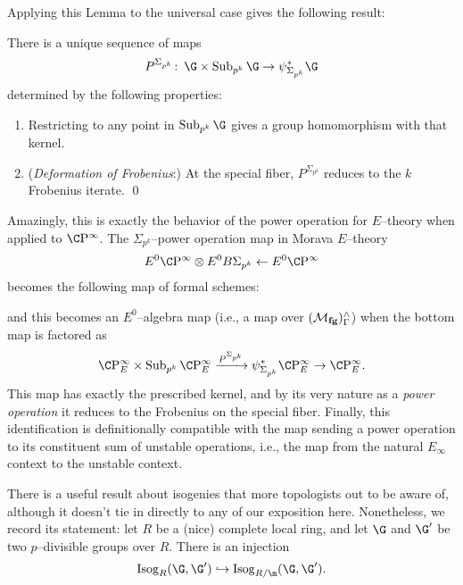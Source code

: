 Applying this Lemma to the universal case gives the following result:

\begin{corollary}
There is a unique sequence of maps \[P^{\Sigma_{p^k}}\co \G \times \Sub_{p^k} \G \to \psi_{\Sigma_{p^k}}^* \G\] determined by the following properties:
\begin{enumerate}
    \item Restricting to any point in $\Sub_{p^k} \G$ gives a group homomorphism with that kernel.
    \item (\textit{Deformation of Frobenius}:) At the special fiber, $P^{\Sigma_{p^k}}$ reduces to the $k${\th} Frobenius iterate.
    \qed {}
\end{enumerate}
\end{corollary}

Amazingly, this is exactly the behavior of the power operation for $E$--theory when applied to $\CP^\infty$.  The $\Sigma_{p^k}$--power operation map in Morava $E$--theory \[E^0 \CP^\infty \otimes E^0 B\Sigma_{p^k} \from E^0 \CP^\infty\] becomes the following map of formal schemes:
\begin{center}
\end{center}
and this becomes an $E^0$--algebra map (i.e., a map over $(\mathcal{M}_{\mathbf{fg}})^\wedge_\Gamma$) when the bottom map is factored as \[\CP^\infty_E \times \Sub_{p^k} \CP^\infty_E \xrightarrow{P^{\Sigma_{p^k}}} \psi_{\Sigma_{p^k}}^* \CP^\infty_E \to \CP^\infty_E.\]  This map has exactly the prescribed kernel, and by its very nature as a \emph{power operation} it reduces to the Frobenius on the special fiber.  Finally, this identification is definitionally compatible with the map sending a power operation to its constituent sum of unstable operations, i.e., the map from the natural $E_\infty$ context to the unstable context.

\begin{remark}
There is a useful result about isogenies that more topologists out to be aware of, although it doesn't tie in directly to any of our exposition here.  Nonetheless, we record its statement: let $R$ be a (nice) complete local ring, and let $\G$ and $\G'$ be two $p$--divisible groups over $R$.  There is an injection \[\Isog_R(\G, \G') \into \Isog_{R/\m}(\G, \G').\]
\end{remark}











